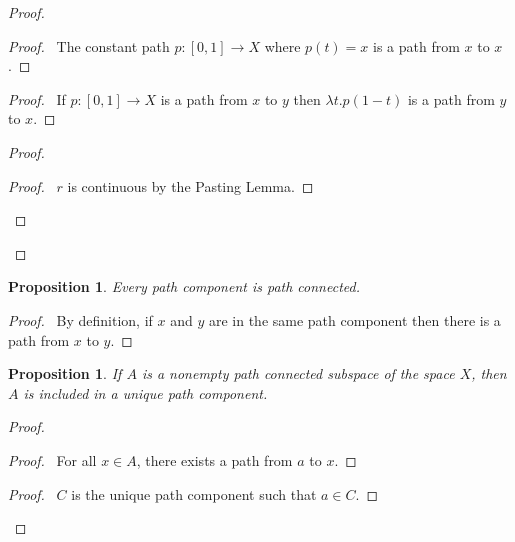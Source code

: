 \documentclass{report}
\let\qed\relax
\newtheorem{prop}[lm]{Proposition}
\theoremstyle{definition}
\begin{document}
  \begin{proof}
    \pf
    \begin{proof}
      \pf\ The constant path $p : [0,1] \rightarrow X$ where $p(t) = x$ is a
      path from $x$ to $x$.
    \end{proof}
    \begin{proof}
      \pf\ If $p : [0,1] \rightarrow X$ is a path from $x$ to $y$ then $\lambda
      t. p(1-t)$ is a path from $y$ to $x$.
    \end{proof}
    \begin{proof}
      \begin{proof}
        \pf\ $r$ is continuous by the Pasting Lemma.
      \end{proof}
    \end{proof}
    \qed
  \end{proof}

  \begin{prop}
    Every path component is path connected.
  \end{prop}

  \begin{proof}
    \pf\ By definition, if $x$ and $y$ are in the same path component then
    there
    is a path from $x$ to $y$. \qed
  \end{proof}

  \begin{prop}
    \label{prop:topology:path_connected:subset}
    If $A$ is a nonempty path connected subspace of the space $X$, then $A$ is
    included in a unique path component.
  \end{prop}

  \begin{proof}
    \pf
    \begin{proof}
      \pf\ For all $x \in A$, there exists a path from $a$ to $x$.
    \end{proof}
    \begin{proof}
      \pf\ $C$ is the unique path component such that $a \in C$.
    \end{proof}
    \qed
  \end{proof}
\end{document}
